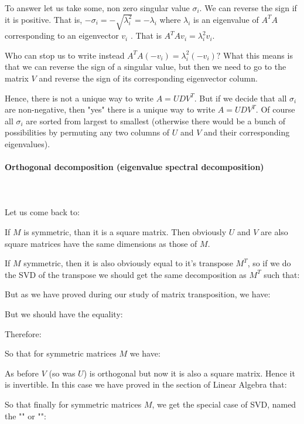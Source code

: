 	To answer let us take some, non zero singular value $\sigma_{i}$. We can reverse the sign if it is positive. That is, $-\sigma_{i}=-\sqrt{\lambda_{i}^{2}}=-\lambda_{i}$ where $\lambda_{i}$ is an eigenvalue of $A^{T} A$ corresponding to an eigenvector $v_{i}$ . That is $A^{T} A v_{i}=\lambda_{i}^{2} v_{i}$. 
	
	Who can stop us to write instead $A^{T} A\left(-v_{i}\right)=\lambda_{i}^{2}\left(-v_{i}\right) ?$ What this means is that we can reverse the sign of a singular value, but then we need to go to the matrix $V$ and reverse the sign of its corresponding eigenvector column.

	Hence, there is not a unique way to write $A=U D V^{T}$. But if we decide that all $\sigma_{i}$ are non-negative, then "yes" there is a unique way to write $A=UD V^{T}$. Of course all $\sigma_{i}$ are sorted from largest to smallest (otherwise there would be a bunch of possibilities by permuting any two columns of $U$ and $V$ and their corresponding eigenvalues).
	
	\paragraph{Orthogonal decomposition (eigenvalue spectral decomposition)}\mbox{}\\\\
	Let us come back to:
	
	If $M$ is symmetric, than it is a square matrix. Then obviously $U$ and $V$ are also square matrices have the same dimensions as those of $M$.
	
	If $M$ symmetric, then it is also obviously equal to it's transpose $M^T$, so if we do the SVD of the transpose we should get the same decomposition as $M^T$ such that:
	
	But as we have proved during our study of matrix transposition, we have:
	
	But we should have the equality:
	
	Therefore:
	
	So that for symmetric matrices $M$ we have:
	
	As before $V$ (so was $U$) is orthogonal but now it is also a square matrix. Hence it is invertible. In this case we have proved in the section of Linear Algebra that:
	
	So that finally for symmetric matrices $M$, we get the special case of SVD, named the "\label{orthogonal decomposition}" or "":
	
